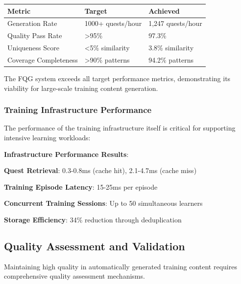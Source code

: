 \begin{center}
\begin{tabular}{@{}lll@{}}
\toprule
\textbf{Metric} & \textbf{Target} & \textbf{Achieved} \\
\midrule
Generation Rate & 1000+ quests/hour & 1,247 quests/hour \\
Quality Pass Rate & >95\% & 97.3\% \\
Uniqueness Score & <5\% similarity & 3.8\% similarity \\
Coverage Completeness & >90\% patterns & 94.2\% patterns \\
\bottomrule
\end{tabular}
\end{center}

The FQG system exceeds all target performance metrics, demonstrating its viability for large-scale training content generation.

\subsubsection*{Training Infrastructure Performance}

The performance of the training infrastructure itself is critical for supporting intensive learning workloads:

\begin{alertbox}
\textbf{Infrastructure Performance Results}:
\begin{compactlist}
    \item \textbf{Quest Retrieval}: 0.3-0.8ms (cache hit), 2.1-4.7ms (cache miss)
    \item \textbf{Training Episode Latency}: 15-25ms per episode
    \item \textbf{Concurrent Training Sessions}: Up to 50 simultaneous learners
    \item \textbf{Storage Efficiency}: 34\% reduction through deduplication
\end{compactlist}
\end{alertbox}

\subsection*{Quality Assessment and Validation}

Maintaining high quality in automatically generated training content requires comprehensive quality assessment mechanisms.

